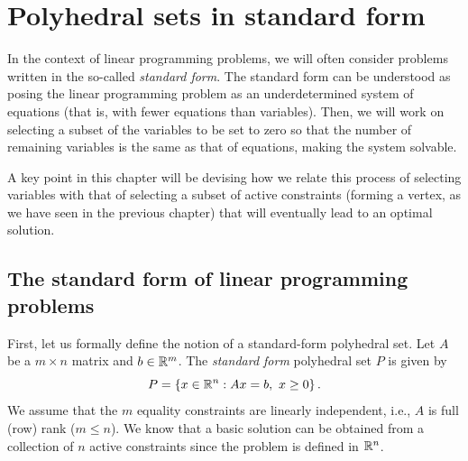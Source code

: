 \section{Polyhedral sets in standard form}

In the context of linear programming problems, we will often consider problems written in the so-called \emph{standard form}. The standard form can be understood as posing the linear programming problem as an underdetermined system of equations (that is, with fewer equations than variables). Then, we will work on selecting a subset of the variables to be set to zero so that the number of remaining variables is the same as that of equations, making the system solvable. 

A key point in this chapter will be devising how we relate this process of selecting variables with that of selecting a subset of active constraints (forming a vertex, as we have seen in the previous chapter) that will eventually lead to an optimal solution. 


\subsection{The standard form of linear programming problems}

First, let us formally define the notion of a standard-form polyhedral set. Let $A$ be a $m \times n$ matrix and $b \in \mathbb{R}^m$. The \emph{standard form} polyhedral set $P$ is given by 
%
\begin{equation*}
	P = \left\{ x \in \mathbb{R}^n : Ax = b, ~x \geq 0 \right \}.		
\end{equation*}
%
We assume that the $m$ equality constraints are linearly independent, i.e., $A$ is full (row) rank ($m \leq n$). We know that a basic solution can be obtained from a collection of $n$ active constraints since the problem is defined in $\mathbb{R}^n$. 

